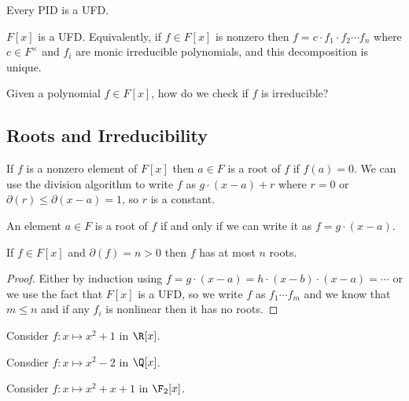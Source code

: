 \begin{theorem}
Every PID is a UFD.
\end{theorem}

\begin{corollary}
$F[x]$ is a UFD. Equivalently, if $f \in F[x]$ is nonzero then $f = c \cdot f_1 \cdot f_2 \cdots f_n$ where $c \in F^\times$ and $f_i$ are monic irreducible polynomials, and this decomposition is unique.
\end{corollary}

\begin{problem}
Given a polynomial $f \in F[x]$, how do we check if $f$ is irreducible?
\end{problem}

\subsection{Roots and Irreducibility}

\begin{definition}
If $f$ is a nonzero element of $F[x]$ then $a \in F$ is a root of $f$ if $f(a) = 0$. We can use the division algorithm to write $f$ as $g \cdot (x-a) + r$ where $r = 0$ or $\partial(r) \leq \partial(x-a) = 1$, so $r$ is a constant.
\end{definition}

\begin{corollary}
An element $a \in F$ is a root of $f$ if and only if we can write it as $f = g \cdot (x-a)$.
\end{corollary}

\begin{corollary}
If $f \in F[x]$ and $\partial(f) = n > 0$ then $f$ has at most $n$ roots.
\end{corollary}

\begin{proof}
Either by induction using $f = g \cdot (x-a) = h \cdot (x-b) \cdot (x-a) = \cdots$ or we use the fact that $F[x]$ is a UFD, so we write $f$ as $f_1 \cdots f_m$ and we know that $m \leq n$ and if any $f_i$ is nonlinear then it has no roots. 
\end{proof}

\begin{example}
\item Consider $f\colon x \mapsto x^2 + 1$ in $\R[x]$.
\item Consdier $f\colon x \mapsto x^2-2$ in $\Q[x]$.
\item Consider $f\colon x \mapsto x^2 + x + 1$ in $\F_2[x]$.
\end{example}

